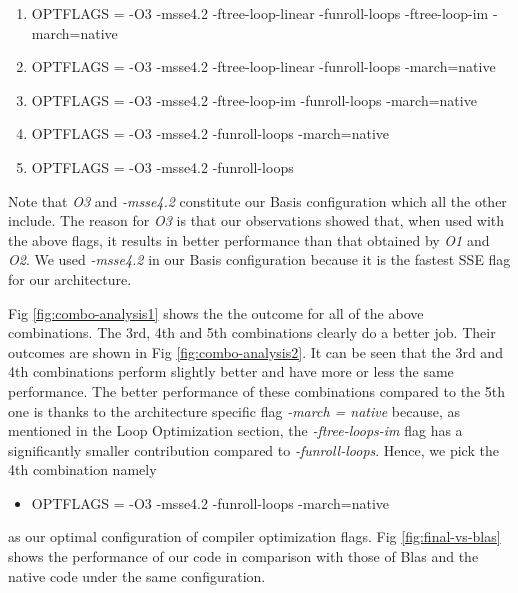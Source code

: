 \documentclass{article}
\begin{document}
\begin{enumerate}

\item OPTFLAGS = -O3 -msse4.2 -ftree-loop-linear -funroll-loops -ftree-loop-im -march=native

\item OPTFLAGS = -O3 -msse4.2 -ftree-loop-linear -funroll-loops -march=native

\item OPTFLAGS = -O3 -msse4.2 -ftree-loop-im -funroll-loops -march=native

\item OPTFLAGS = -O3 -msse4.2 -funroll-loops -march=native

\item OPTFLAGS = -O3 -msse4.2 -funroll-loops

\end{enumerate}

Note that \textit{O3} and \textit{-msse4.2} constitute our Basis configuration which all the other include. The reason for \textit{O3} is that our observations showed that, when used with the above flags, it results in better performance than that obtained by \textit{O1} and \textit{O2}. We used \textit{-msse4.2} in our Basis configuration because it is the fastest SSE flag for our architecture. 

 
Fig \ref{fig:combo-analysis1} shows the the outcome for all of the above combinations. The 3rd, 4th and 5th combinations clearly do a better job. Their outcomes are shown in Fig \ref{fig:combo-analysis2}. It can be seen that the 3rd  and 4th combinations perform slightly better and have more or less the same performance. The better performance of these combinations compared to the 5th one is thanks to the architecture specific flag \textit{-march = native} because, as mentioned in the Loop Optimization section, the \textit{-ftree-loops-im} flag has a significantly smaller contribution compared to \textit{-funroll-loops}. Hence, we pick the 4th combination namely

\begin{itemize}

\item OPTFLAGS = -O3 -msse4.2 -funroll-loops -march=native

\end{itemize}
%
as our optimal configuration of compiler optimization flags. Fig \ref{fig:final-vs-blas} shows the performance of our code in comparison with those of Blas and the native code under the same configuration.
 
\end{document}
